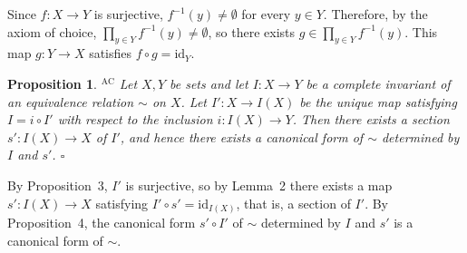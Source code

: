\documentclass{article}
\makeatletter
\theoremstyle{noperiod}
\newtheorem{proposition}{Proposition}
\renewenvironment{proof}[1][\proofname]{\par
  \pushQED{\qed}
  \normalfont \topsep6\p@\@plus6\p@\relax
  \trivlist
  \item[\hskip\labelsep
        \itshape
    #1 ]\ignorespaces
}{
  \popQED\endtrivlist\@endpefalse
}
\renewcommand{\proofname}{\bfseries Proof}
\makeatother
\begin{document}
\begin{proof}
Since $f \colon X \to Y$ is surjective, $f^{-1}(y) \neq \emptyset$ for every
$y \in Y$. Therefore, by the axiom of choice, $\prod_{y \in Y} f^{-1}(y) \neq
\emptyset$, so there exists $g \in \prod_{y \in Y} f^{-1}(y)$. This map
$g \colon Y \to X$ satisfies $f \circ g = \mathrm{id}_Y$.
\end{proof}

\begin{proposition}\hspace{-0.7em}$^{\textrm{AC}}$\hspace{0.2em}
Let $X, Y$ be sets and let $I \colon X \to Y$ be a complete invariant of an
equivalence relation $\sim$ on $X$. Let $I' \colon X \to I(X)$ be the unique
map satisfying $I = i \circ I'$ with respect to the inclusion
$i \colon I(X) \to Y$. Then there exists a section $s' \colon I(X) \to X$ of
$I'$, and hence there exists a canonical form of $\sim$ determined by $I$ and
$s'$.
\hfill $\square$
\end{proposition}

\begin{proof}
By Proposition~3, $I'$ is surjective, so by Lemma~2 there exists a map
$s' \colon I(X) \to X$ satisfying $I' \circ s' = \mathrm{id}_{I(X)}$, that
is, a section of $I'$. By Proposition~4, the canonical form $s' \circ I'$ of
$\sim$ determined by $I$ and $s'$ is a canonical form of $\sim$.
\end{proof}
\end{document}
